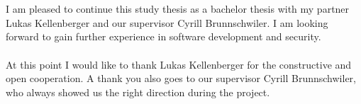\\\\
I am pleased to continue this study thesis as a bachelor thesis with my partner Lukas Kellenberger and our supervisor Cyrill Brunnschwiler. I am looking forward to gain further experience in software development and security.
\\\\
At this point I would like to thank Lukas Kellenberger for the constructive and open cooperation. A thank you also goes to our supervisor Cyrill Brunnschwiler, who always showed us the right direction during the project.
